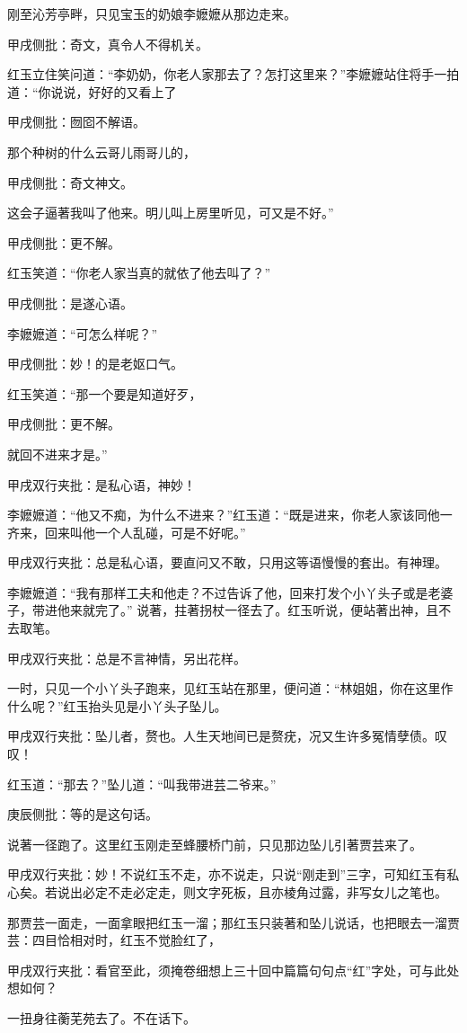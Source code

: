 \begin{parag}


    刚至沁芳亭畔，只见宝玉的奶娘李嬷嬷从那边走来。\begin{note}甲戌侧批：奇文，真令人不得机关。\end{note}红玉立住笑问道：“李奶奶，你老人家那去了？怎打这里来？”李嬷嬷站住将手一拍道：“你说说，好好的又看上了\begin{note}甲戌侧批：囫囵不解语。\end{note}那个种树的什么云哥儿雨哥儿的，\begin{note}甲戌侧批：奇文神文。\end{note}这会子逼著我叫了他来。明儿叫上房里听见，可又是不好。”\begin{note}甲戌侧批：更不解。\end{note}红玉笑道：“你老人家当真的就依了他去叫了？”\begin{note}甲戌侧批：是遂心语。\end{note}李嬷嬷道：“可怎么样呢？”\begin{note}甲戌侧批：妙！的是老妪口气。\end{note}红玉笑道：“那一个要是知道好歹，\begin{note}甲戌侧批：更不解。\end{note}就回不进来才是。”\begin{note}甲戌双行夹批：是私心语，神妙！\end{note}李嬷嬷道：“他又不痴，为什么不进来？”红玉道：“既是进来，你老人家该同他一齐来，回来叫他一个人乱碰，可是不好呢。”\begin{note}甲戌双行夹批：总是私心语，要直问又不敢，只用这等语慢慢的套出。有神理。\end{note}李嬷嬷道：“我有那样工夫和他走？不过告诉了他，回来打发个小丫头子或是老婆子，带进他来就完了。” 说著，拄著拐杖一径去了。红玉听说，便站著出神，且不去取笔。\begin{note}甲戌双行夹批：总是不言神情，另出花样。\end{note}
\end{parag}


\begin{parag}


    一时，只见一个小丫头子跑来，见红玉站在那里，便问道：“林姐姐，你在这里作什么呢？”红玉抬头见是小丫头子坠儿。\begin{note}甲戌双行夹批：坠儿者，赘也。人生天地间已是赘疣，况又生许多冤情孽债。叹叹！\end{note}红玉道：“那去？”坠儿道：“叫我带进芸二爷来。”\begin{note}庚辰侧批：等的是这句话。\end{note}说著一径跑了。这里红玉刚走至蜂腰桥门前，只见那边坠儿引著贾芸来了。\begin{note}甲戌双行夹批：妙！不说红玉不走，亦不说走，只说“刚走到”三字，可知红玉有私心矣。若说出必定不走必定走，则文字死板，且亦棱角过露，非写女儿之笔也。\end{note}那贾芸一面走，一面拿眼把红玉一溜；那红玉只装著和坠儿说话，也把眼去一溜贾芸：四目恰相对时，红玉不觉脸红了，\begin{note}甲戌双行夹批：看官至此，须掩卷细想上三十回中篇篇句句点“红”字处，可与此处想如何？\end{note}一扭身往蘅芜苑去了。不在话下。
\end{parag}


